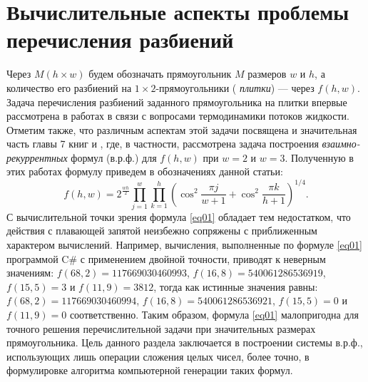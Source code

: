 \chapter{Вычислительные аспекты проблемы перечисления разбиений}









Через $M(h\times w)$ будем обозначать прямоугольник $M$ размеров $w$ и $h$, а количество его разбиений на $1\times 2$-прямоугольники (\textit{ плитки}) --- через $f(h,w)$.
Задача перечисления разбиений заданного прямоугольника на плитки впервые рассмотрена в работах \cite{akm_2,akm_3} в связи с вопросами термодинамики потоков жидкости. Отметим также, что различным аспектам этой задачи посвящена и значительная часть главы 7 книг \cite{akm_6} и \cite{akm_7}, где, в частности, рассмотрена задача построения \textit{ взаимно-рекуррентных} формул (в.р.ф.) для $f(h,w)$ при $w=2$ и $w=3$. Полученную в этих работах формулу приведем в обозначениях данной статьи:
\begin{equation}\label{eq01}
f(h,w)=2^{\frac{wh}{2}}\prod_{j=1}^{w} \prod_{k=1}^{h}
\left(
\cos^2{\frac{\pi j}{w+1}}
+\cos^2{\frac{\pi k}{h+1}}
\right)^{1/4}.
\end{equation}
С вычислительной точки зрения формула \eqref{eq01} обладает тем недостатком, что действия с плавающей запятой неизбежно сопряжены с приближенным характером вычислений. Например, вычисления, выполненные по формуле \eqref{eq01} программой C\# с применением двойной точности, приводят к неверным значениям: $f(68,2)=117669030460993$, $f(16,8)=540061286536919$, $f(15,5)=3$ и $f(11,9)=3812$, тогда как истинные значения равны: $f(68,2)=117669030460994$, $f(16,8)=540061286536921$, $f(15,5)=0$ и $f(11,9)=0$ соответственно. Таким образом, формула \eqref{eq01} малопригодна для точного решения перечислительной задачи при значительных размерах прямоугольника.
Цель данного раздела заключается в построении системы в.р.ф., использующих лишь операции сложения целых чисел, более точно, в формулировке алгоритма компьютерной генерации таких формул.

